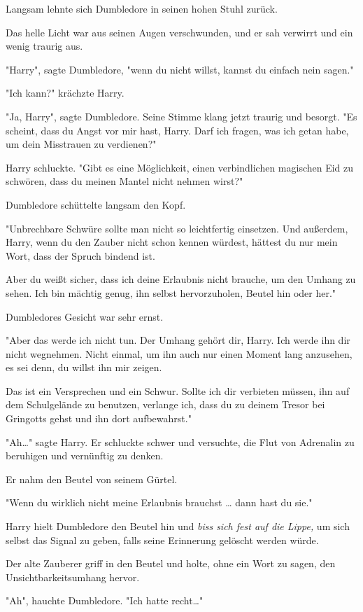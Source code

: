 {Langsam lehnte sich Dumbledore in seinen hohen Stuhl zurück.

Das helle Licht war aus seinen Augen verschwunden, und er sah verwirrt und ein wenig traurig aus.

"Harry", sagte Dumbledore, "wenn du nicht willst, kannst du einfach nein sagen."

"Ich kann?" krächzte Harry.

"Ja, Harry", sagte Dumbledore. Seine Stimme klang jetzt traurig und besorgt. "Es scheint, dass du Angst vor mir hast, Harry. Darf ich fragen, was ich getan habe, um dein Misstrauen zu verdienen?"

Harry schluckte. "Gibt es eine Möglichkeit, einen verbindlichen magischen Eid zu schwören, dass du meinen Mantel nicht nehmen wirst?"

Dumbledore schüttelte langsam den Kopf.

"Unbrechbare Schwüre sollte man nicht so leichtfertig einsetzen. Und außerdem, Harry, wenn du den Zauber nicht schon kennen würdest, hättest du nur mein Wort, dass der Spruch bindend ist.

Aber du weißt sicher, dass ich deine Erlaubnis nicht brauche, um den Umhang zu sehen. Ich bin mächtig genug, ihn selbst hervorzuholen, Beutel hin oder her."

Dumbledores Gesicht war sehr ernst.

"Aber das werde ich nicht tun. Der Umhang gehört dir, Harry. Ich werde ihn dir nicht wegnehmen. Nicht einmal, um ihn auch nur einen Moment lang anzusehen, es sei denn, du willst ihn mir zeigen.

Das ist ein Versprechen und ein Schwur. Sollte ich dir verbieten müssen, ihn auf dem Schulgelände zu benutzen, verlange ich, dass du zu deinem Tresor bei Gringotts gehst und ihn dort aufbewahrst."

"Ah…" sagte Harry. Er schluckte schwer und versuchte, die Flut von Adrenalin zu beruhigen und vernünftig zu denken.

Er nahm den Beutel von seinem Gürtel.

"Wenn du wirklich nicht meine Erlaubnis brauchst … dann hast du sie."

Harry hielt Dumbledore den Beutel hin und \emph{biss sich fest auf die Lippe,} um sich selbst das Signal zu geben, falls seine Erinnerung gelöscht werden würde.

Der alte Zauberer griff in den Beutel und holte, ohne ein Wort zu sagen, den Unsichtbarkeitsumhang hervor.

"Ah", hauchte Dumbledore. "Ich hatte recht…"

}
